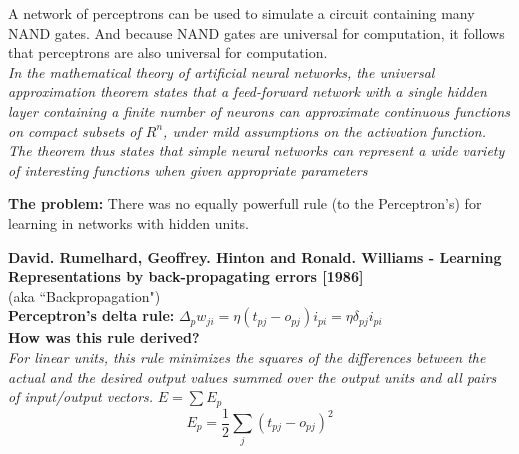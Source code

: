 \documentclass[10pt, compress]{beamer}
\begin{document}
\begin{frame}
   A network of perceptrons can be used to simulate a circuit containing many NAND gates. And because NAND gates are universal for computation, it follows that perceptrons are also universal for computation. \\ \hfill \break
  \textit{In the mathematical theory of artificial neural networks, the universal approximation theorem states that a feed-forward network with a single hidden layer containing a finite number of neurons can approximate continuous functions on compact subsets of $R^n$, under mild assumptions on the activation function. The theorem thus states that simple neural networks can represent a wide variety of interesting functions when given appropriate parameters}
\end{frame}

\begin{frame}
  \vspace{.8cm}
  \textbf{The problem:} There was no equally powerfull rule (to the Perceptron's) for learning in networks with hidden units. \\
  \vspace{.5cm}

  \textbf{David. Rumelhard, Geoffrey. Hinton and Ronald. Williams - Learning Representations by back-propagating errors [1986]} \\
  (aka ``Backpropagation") \\

  \vspace{.5cm}
  \textbf{Perceptron's delta rule:} $\Delta_pw_{ji} = \eta (t_{pj} - o_{pj})i_{pi} = \eta \delta_{pj} i_{pi}$ \\ \hfill \break
  \textbf{How was this rule derived?} \\
  \textit{For linear units, this rule minimizes the squares of the differences between the actual and the desired output values summed over the output units and all pairs of input/output vectors.} $E = \sum E_p$
  $$ E_p = \frac{1}{2}\sum_j (t_{pj} - o_{pj})^2$$

\end{frame}
\end{document}
